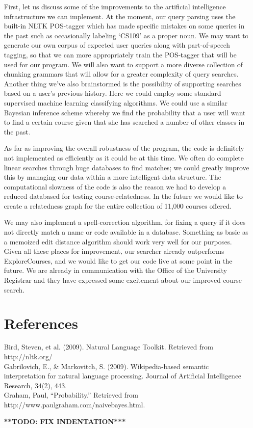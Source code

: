 \documentclass[12pt]{article}
\newcommand{\todo}[1]{{\Large \bf ***TODO: #1***}}
\begin{document}
First, let us discuss some of the improvements to the artificial
intelligence infrastructure we can implement. At the moment, our query
parsing uses the built-in NLTK POS-tagger which has made specific
mistakes on some queries in the past such as occasionally labeling
`CS109' as a proper noun. We may want to generate our own corpus of
expected user queries along with part-of-speech tagging, so that we
can more appropriately train the POS-tagger that will be used for our
program. We will also want to support a more diverse collection of
chunking grammars that will allow for a greater complexity of query
searches. Another thing we've also brainstormed is the possibility of
supporting searches based on a user's previous history. Here we could
employ some standard supervised machine learning classifying
algorithms. We could use a similar Bayesian inference scheme whereby
we find the probability that a user will want to find a certain course
given that she has searched a number of other classes in the past.

As far as improving the overall robustness of the program, the code is
definitely not implemented as efficiently as it could be at this
time. We often do complete linear searches through huge databases to
find matches; we could greatly improve this by managing our data
within a more intelligent data structure. The computational slowness
of the code is also the reason we had to develop a reduced databased
for testing course-relatedness. In the future we would like to create
a relatedness graph for the entire collection of 11,000 courses
offered. 

We may also implement a spell-correction algorithm,
for fixing a query if it does not directly match a name or code
available in a database. Something as basic as a memoized edit
distance algorithm should work very well for our purposes. Given all
these places for improvement, our searcher already outperforms
ExploreCourses, and we would like to get our code live at some point
in the future. We are already in communication with the Office of the
University Registrar and they have expressed some excitement about our
improved course search.



\section*{References}

\indent Bird, Steven, et al. (2009). Natural Language Toolkit. Retrieved from http://nltk.org/\\

Gabrilovich, E., \& Markovitch, S. (2009). Wikipedia-based semantic interpretation for natural language processing. Journal of Artificial Intelligence Research, 34(2), 443.\\

Graham, Paul, ``Probability.'' Retrieved from http://www.paulgraham.com/naivebayes.html.



\todo{FIX INDENTATION}
\end{document}
